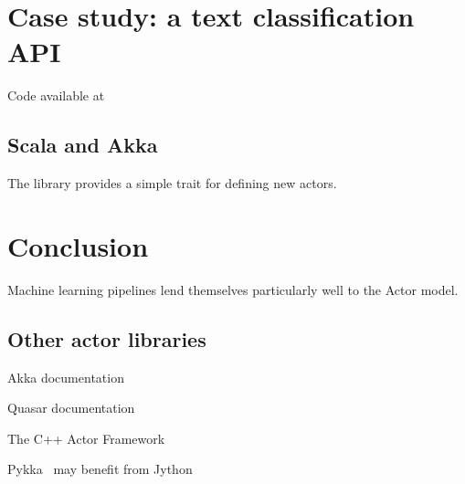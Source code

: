 \documentclass{article}
\begin{document}
\section{Case study: a text classification API}

Code available at~\cite{gawalt_papis_demo}

\subsection{Scala and Akka}

The library provides a simple trait for defining new actors.

\section{Conclusion}

Machine learning pipelines lend themselves particularly well to the Actor model.

\subsection{Other actor libraries}

Akka documentation~\cite{akka_doc}

Quasar documentation~\cite{quasar_doc}

The C++ Actor Framework~\cite{charousset2014caf}

Pykka~\cite{pykka_doc} may benefit from Jython~\cite{jython}



\end{document}
